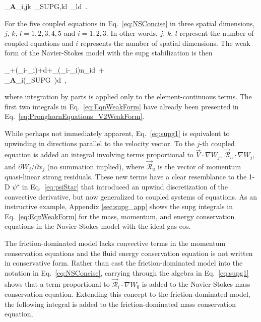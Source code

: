 \beq
\label{eq:supg2}
\int_\Omega\epsilon\textbf{A}_{i,jk\ }\tau_{SUPG,kl\ }_ld\Omega\ .
\eeq

\noindent For the five coupled equations in Eq.\ \eqref{eq:NSConcise} in three spatial dimensions, \(j\), \(k\), \(l=1,2,3,4,5\) and \(i=1,2,3\). In other words, \(j\), \(k\), \(l\) represent the number of coupled equations and \(i\) represents the number of spatial dimensions. The weak form of the Navier-Stokes model with the \gls{supg} stabilization is then

\beqa
\label{eq:EqnWeakForm}
\int_{\Omega}\left\lbrack\epsilon{}\cdot{}+\cdot\left(_i-\epsilon{}_i\right)+\cdot{}\right\rbrack d\Omega+\int_{\Gamma}\left(\epsilon{}_i-_i\right)\cdot{}n_id\Gamma\ +\hspace{1cm}\\
\int_\Omega\epsilon\left\lbrack\textbf{A}_i\left(\tau_{SUPG}\ \right)\right\rbrack\cdot{}d\ ,
\eeqa

\noindent where integration by parts is applied only to the element-continuous terms. The first two integrals in Eq.\ \eqref{eq:EqnWeakForm} have already been presented in Eq.\ \eqref{eq:PronghornEquations_V2WeakForm}.

While perhaps not immediately apparent, Eq.\ \eqref{eq:supg1} is equivalent to upwinding in directions parallel to the velocity vector. To the \(j\)-th coupled equation is added an integral involving terms proportional to \(\vec{V}\cdot\nabla W_j\), \(\vec{\mathscr{R}}_u\cdot\nabla W_j\), and \(\partial W_j/\partial x_j\) (no summation implied), where \(\vec{\mathscr{R}}_u\) is the vector of momentum quasi-linear strong residuals. These new terms have a clear resemblance to the 1-D \(\psi^\star\) in Eq.\ \eqref{eq:psiStar} that introduced an upwind discretization of the convective derivative, but now generalized to coupled systems of equations. As an instructive example, Appendix \ref{sec:supg_app} shows the \gls{supg} integrals in Eq.\ \eqref{eq:EqnWeakForm} for the mass, momentum, and energy conservation equations in the Navier-Stokes model with the ideal gas \gls{eos}.

The friction-dominated model lacks convective terms in the momentum conservation equations and the fluid energy conservation equation is not written in conservative form. Rather than cast the friction-dominated model into the notation in Eq.\ \eqref{eq:NSConcise}, carrying through the algebra in Eq.\ \eqref{eq:supg1} shows that a term proportional to \(\vec{\mathscr{R}}_i\cdot\nabla W_0\) is added to the Navier-Stokes mass conservation equation. Extending this concept to the friction-dominated model, the following integral is added to the friction-dominated mass conservation equation,

